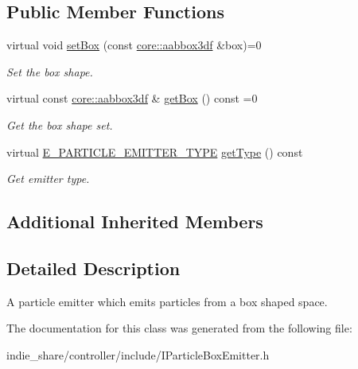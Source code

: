 \subsection*{Public Member Functions}
\begin{DoxyCompactItemize}
\item 
\mbox{\label{classirr_1_1scene_1_1IParticleBoxEmitter_af3833d2cc46d1a704f5dd6f9c12e40a8}} 
virtual void \hyperlink{classirr_1_1scene_1_1IParticleBoxEmitter_af3833d2cc46d1a704f5dd6f9c12e40a8}{set\+Box} (const \hyperlink{namespaceirr_1_1core_adfc8fa01b30044c55f3332a1d6c1aa19}{core\+::aabbox3df} \&box)=0
\begin{DoxyCompactList}\small\item\em Set the box shape. \end{DoxyCompactList}\item 
\mbox{\label{classirr_1_1scene_1_1IParticleBoxEmitter_a06eaf3f090994cd4d5a8d52a63652504}} 
virtual const \hyperlink{namespaceirr_1_1core_adfc8fa01b30044c55f3332a1d6c1aa19}{core\+::aabbox3df} \& \hyperlink{classirr_1_1scene_1_1IParticleBoxEmitter_a06eaf3f090994cd4d5a8d52a63652504}{get\+Box} () const =0
\begin{DoxyCompactList}\small\item\em Get the box shape set. \end{DoxyCompactList}\item 
\mbox{\label{classirr_1_1scene_1_1IParticleBoxEmitter_a7072d42775bc75b9d5a08f26d39a27a0}} 
virtual \hyperlink{namespaceirr_1_1scene_a3e251a881c886884a78adea2e546272b}{E\+\_\+\+P\+A\+R\+T\+I\+C\+L\+E\+\_\+\+E\+M\+I\+T\+T\+E\+R\+\_\+\+T\+Y\+PE} \hyperlink{classirr_1_1scene_1_1IParticleBoxEmitter_a7072d42775bc75b9d5a08f26d39a27a0}{get\+Type} () const
\begin{DoxyCompactList}\small\item\em Get emitter type. \end{DoxyCompactList}\end{DoxyCompactItemize}
\subsection*{Additional Inherited Members}


\subsection{Detailed Description}
A particle emitter which emits particles from a box shaped space. 

The documentation for this class was generated from the following file\+:\begin{DoxyCompactItemize}
\item 
indie\+\_\+share/controller/include/I\+Particle\+Box\+Emitter.\+h\end{DoxyCompactItemize}
